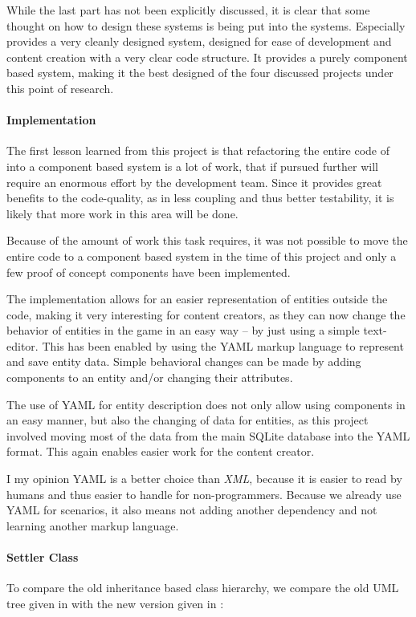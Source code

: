 While the last part has not been explicitly discussed, it is clear that some thought on how to design these systems is
being put into the systems. Especially \AD{} provides a very cleanly designed system, designed for ease of development
and content creation with a very clear code structure.
It provides a purely component based system, making it the best designed of the four discussed projects under this point
of research.

\paragraph{Implementation}
The first lesson learned from this project is that refactoring the entire code of \UH{} into a component based system is
a lot of work, that if pursued further will require an enormous effort by the development team. Since it provides
great benefits to the code-quality, as in less coupling and thus better testability, it is likely that more work in this
area will be done.

Because of the amount of work this task requires, it was not possible to move the entire code to a
component based system in the time of this project and only a few proof of concept components have been implemented.

The implementation allows for an easier representation of entities outside the code, making it very interesting
for content creators, as they can now change the behavior of entities in the game in an easy way -- by just using a simple
text-editor. This has been enabled by using the YAML markup language to represent and save entity data. Simple
behavioral changes can be made by adding components to an entity and/or changing their attributes.

The use of YAML for entity description does not only allow using components in an easy manner, but also the changing of
data for entities, as this project involved moving most of the data from the main SQLite database into the YAML format.
This again enables easier work for the content creator.

I my opinion YAML is a better choice than \textit{XML}, because it is easier to read by humans and thus easier to handle
for non-programmers. Because we already use YAML for scenarios, it also means not adding another dependency and not
learning another markup language.

\paragraph{Settler Class}
To compare the old inheritance based class hierarchy, we compare the old UML tree given in  with
the new version given in :

